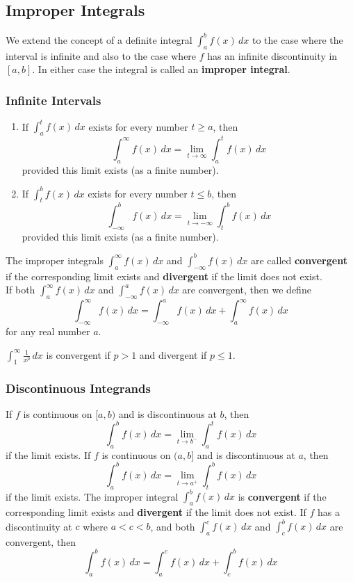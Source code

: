 \subsection{Improper Integrals}
We extend the concept of a definite integral
\(\displaystyle{\int_a^b f(x)\,dx}\) to the case where the interval is
infinite and also to the case where \(f\) has an infinite discontinuity in
\([a,b]\).
In either case the integral is called an \textbf{improper integral}.

\subsubsection*{Infinite Intervals}
\begin{definition}
    \begin{enumerate}
        \item If \(\displaystyle{\int_a^t f(x)\,dx}\) exists for every number
        \(t\geq a\), then
        \[\int_a^\infty f(x)\,dx=\lim_{t\to\infty}\int_a^t f(x)\,dx\]
        provided this limit exists (as a finite number).
        \item If \(\displaystyle{\int_t^b f(x)\,dx}\) exists for every number
        \(t\leq b\), then
        \[\int_{-\infty}^b f(x)\,dx=\lim_{t\to -\infty}\int_t^b f(x)\,dx\]
        provided this limit exists (as a finite number).
    \end{enumerate}
    The improper integrals \(\displaystyle{\int_a^\infty f(x)\,dx}\) and
    \(\displaystyle{\int_{-\infty}^b f(x)\,dx}\) are called
    \textbf{convergent} if the corresponding limit exists and
    \textbf{divergent} if the limit does not exist. \\
    If both \(\displaystyle{\int_a^\infty f(x)\,dx}\) and
    \(\displaystyle{\int_{-\infty}^a f(x)\,dx}\) are convergent, then we define
    \[\int_{-\infty}^{\infty}f(x)\,dx
    =\int_{-\infty}^a f(x)\,dx+\int_a^\infty f(x)\,dx\]
    for any real number \(a\).
\end{definition}
\(\displaystyle{\int_1^\infty \frac{1}{x^p}\,dx}\) is convergent if \(p>1\)
and divergent if \(p\leq 1\).

\subsubsection*{Discontinuous Integrands}
\begin{definition}
    If \(f\) is continuous on \([a,b)\) and is discontinuous at \(b\), then
    \[\int_a^b f(x)\,dx=\lim_{t\to b^-}\int_a^t f(x)\,dx\]
    if the limit exists.
    If \(f\) is continuous on \((a,b]\) and is discontinuous at \(a\), then
    \[\int_a^b f(x)\,dx=\lim_{t\to a^+}\int_t^b f(x)\,dx\]
    if the limit exists.
    The improper integral \(\displaystyle{\int_a^b f(x)\,dx}\) is
    \textbf{convergent} if the corresponding limit exists and
    \textbf{divergent} if the limit does not exist.
    If \(f\) has a discontinuity at \(c\) where \(a<c<b\), and both
    \(\displaystyle{\int_a^c f(x)\,dx}\) and
    \(\displaystyle{\int_c^b f(x)\,dx}\) are convergent,
    then
    \[\int_a^b f(x)\,dx=\int_a^c f(x)\,dx+\int_c^b f(x)\,dx\]
\end{definition}

